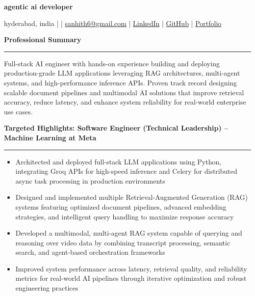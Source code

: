\documentclass[9pt, letterpaper]{article}
\newcommand{\name}[1]{%
    \begin{center}
        {\LARGE \textbf{#1}}
    \end{center}
}
\newcommand{\sectionheading}[1]{%
    \vspace{4pt}%
    {\large \textbf{#1}}%
    \vspace{1pt}%
    \hrule
    \vspace{2pt}%
}
\begin{document}
\name{agentic ai developer}
\begin{center}
    hyderabad, india \quad |  \quad | \quad
    \href{mailto:sanhith6@gmail.com}{sanhith6@gmail.com} \quad | \quad
    \href{https://www.linkedin.com/in/sanhith-reddy-740a1625b/}{LinkedIn} \quad | \quad
    \href{https://github.com/tsanhith}{GitHub} \quad | \quad
    \href{https://johndoe.dev}{Portfolio}
\end{center}

\vspace{0pt}

\sectionheading{Professional Summary}
Full-stack AI engineer with hands-on experience building and deploying production-grade LLM applications leveraging RAG architectures, multi-agent systems, and high-performance inference APIs. Proven track record designing scalable document pipelines and multimodal AI solutions that improve retrieval accuracy, reduce latency, and enhance system reliability for real-world enterprise use cases.

\sectionheading{Targeted Highlights: Software Engineer (Technical Leadership) – Machine Learning at Meta}
\begin{itemize}[leftmargin=0.25in, itemindent=-0.15in, label={--}]
    \item Architected and deployed full-stack LLM applications using Python, integrating Groq APIs for high-speed inference and Celery for distributed async task processing in production environments
    \item Designed and implemented multiple Retrieval-Augmented Generation (RAG) systems featuring optimized document pipelines, advanced embedding strategies, and intelligent query handling to maximize response accuracy
    \item Developed a multimodal, multi-agent RAG system capable of querying and reasoning over video data by combining transcript processing, semantic search, and agent-based orchestration frameworks
    \item Improved system performance across latency, retrieval quality, and reliability metrics for real-world AI pipelines through iterative optimization and robust engineering practices
\end{itemize}
\end{document}
